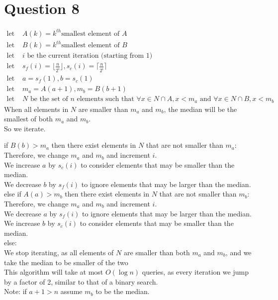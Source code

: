 \documentclass{article}
\begin{document}
\section*{Question 8}
\begin{align*}
    \text{let } &A(k) = k^{th} \text{smallest element of } A\\
    \text{let } &B(k) = k^{th} \text{smallest element of } B\\
    \text{let } &i \text{ be the current iteration (starting from 1)}\\
    \text{let } &s_f(i) = \lfloor\frac{n}{2^i}\rfloor, s_c(i) = \lceil\frac{n}{2^i}\rceil\\
    \text{let } &a = s_f(1), b = s_c(1)\\
    \text{let } &m_a = A(a + 1), m_b = B(b + 1)\\
    \text{let } &N \text{ be the set of } n \text{ elements such that } \forall x \in N \cap A, x < m_a \text{ and } \forall x \in N \cap B, x < m_b
\end{align*}
When all elements in $N$ are smaller than $m_a$ and $m_b$, the median will be the smallest of both $m_a$ and $m_b$.\\

\noindent
So we iterate.

\noindent
if $B(b) > m_a$ then there exist elements in $N$ that are not smaller than $m_a$:\\
    \indent Therefore, we change $m_a$ and $m_b$ and increment $i$.\\
    \indent We increase $a$ by $s_c(i)$ to consider elements that may be smaller than the median.\\
    \indent We decrease $b$ by $s_f(i)$ to ignore elements that may be larger than the median.\\
else if $A(a) > m_b$ then there exist elements in $N$ that are not smaller than $m_b$:\\
    \indent Therefore, we change $m_a$ and $m_b$ and increment $i$.\\
    \indent We decrease $a$ by $s_f(i)$ to ignore elements that may be larger than the median.\\
    \indent We increase $b$ by $s_c(i)$ to consider elements that may be smaller than the median.\\
else:\\
    \indent We stop iterating, as all elements of $N$ are smaller than both $m_a$ and $m_b$, and we take the median to be smaller of the two\\

\noindent This algorithm will take at most $O(\log n)$ queries, as every iteration we jump by a factor of 2, similar to that of a binary search.\\

\noindent
Note: if $a + 1 > n$ assume $m_b$ to be the median.
\end{document}
